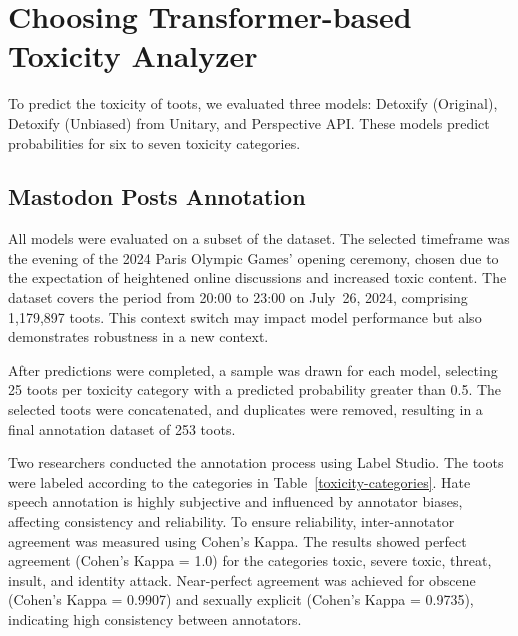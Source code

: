 \chapter{Choosing Transformer-based Toxicity Analyzer} \label{choosing-toxicity-analyzer}
To predict the toxicity of toots, we evaluated three models: Detoxify (Original), Detoxify (Unbiased) from Unitary, and Perspective API. These models predict probabilities for six to seven toxicity categories.

\section{Mastodon Posts Annotation} \label{annotation}
All models were evaluated on a subset of the dataset. The selected timeframe was the evening of the 2024 Paris Olympic Games' opening ceremony, chosen due to the expectation of heightened online discussions and increased toxic content. The dataset covers the period from 20:00 to 23:00 on July~26, 2024, comprising 1,179,897 toots. This context switch may impact model performance but also demonstrates robustness in a new context.

After predictions were completed, a sample was drawn for each model, selecting 25 toots per toxicity category with a predicted probability greater than 0.5. The selected toots were concatenated, and duplicates were removed, resulting in a final annotation dataset of 253 toots.

Two researchers conducted the annotation process using Label Studio. The toots were labeled according to the categories in Table~\ref{toxicity-categories}. Hate speech annotation is highly subjective and influenced by annotator biases, affecting consistency and reliability. To ensure reliability, inter-annotator agreement was measured using Cohen's Kappa. The results showed perfect agreement (Cohen's Kappa = 1.0) for the categories toxic, severe toxic, threat, insult, and identity attack. Near-perfect agreement was achieved for obscene (Cohen's Kappa = 0.9907) and sexually explicit (Cohen's Kappa = 0.9735), indicating high consistency between annotators.

